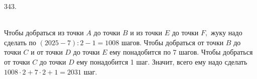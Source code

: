 343. \begin{figure}[ht!]
\end{figure}\\
Чтобы добраться из точки $A$ до точки $B$ и из точки $E$ до точки $F,$ жуку надо сделать по $(2025-7):2-1=1008$ шагов. Чтобы добраться от точки $B$ до точки $C$ и от точки $D$ до точки $E$ ему понадобится по 7 шагов. Чтобы добраться от точки $C$ до точки $D$ ему понадобится 1 шаг. Значит, всего ему надо сделать $1008\cdot2+7\cdot2+1=2031$ шаг.\\
